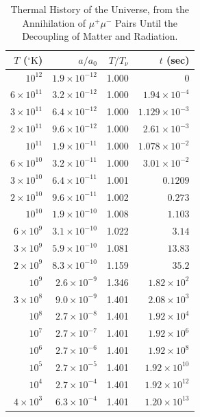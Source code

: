 \begingroup
\renewcommand{\thetable}{15.4}
\begin{table}[htbp]
  \centering
  \caption{Thermal History of the Universe, from the Annihilation of
  \(\mu^+\mu^-\) Pairs Until the Decoupling of Matter and Radiation.}
  \label{tab:15.4}
  \small
  \begin{tabular}{@{}rrrr@{}}
    \toprule
    \(T\) (\(^{\circ}\mathrm K\)) &
    \(a/a_0\) &
    \(T/T_\nu\) &
    \(t\) (sec) \\
    \midrule
    \(10^{12}\)            & \(1.9\times10^{-12}\) & 1.000 & \(0\) \\
    \(6\times10^{11}\)     & \(3.2\times10^{-12}\) & 1.000 & \(1.94\times10^{-4}\) \\
    \(3\times10^{11}\)     & \(6.4\times10^{-12}\) & 1.000 & \(1.129\times10^{-3}\) \\
    \(2\times10^{11}\)     & \(9.6\times10^{-12}\) & 1.000 & \(2.61\times10^{-3}\) \\
    \(10^{11}\)            & \(1.9\times10^{-11}\) & 1.000 & \(1.078\times10^{-2}\) \\
    \(6\times10^{10}\)     & \(3.2\times10^{-11}\) & 1.000 & \(3.01\times10^{-2}\) \\
    \(3\times10^{10}\)     & \(6.4\times10^{-11}\) & 1.001 & \(0.1209\) \\
    \(2\times10^{10}\)     & \(9.6\times10^{-11}\) & 1.002 & \(0.273\) \\
    \(10^{10}\)            & \(1.9\times10^{-10}\) & 1.008 & \(1.103\) \\
    \(6\times10^9\)        & \(3.1\times10^{-10}\) & 1.022 & \(3.14\) \\
    \(3\times10^9\)        & \(5.9\times10^{-10}\) & 1.081 & \(13.83\) \\
    \(2\times10^9\)        & \(8.3\times10^{-10}\) & 1.159 & \(35.2\) \\
    \(10^9\)               & \(2.6\times10^{-9}\)  & 1.346 & \(1.82\times10^2\) \\
    \(3\times10^8\)        & \(9.0\times10^{-9}\)  & 1.401 & \(2.08\times10^3\) \\
    \(10^8\)               & \(2.7\times10^{-8}\)  & 1.401 & \(1.92\times10^4\) \\
    \(10^7\)               & \(2.7\times10^{-7}\)  & 1.401 & \(1.92\times10^6\) \\
    \(10^6\)               & \(2.7\times10^{-6}\)  & 1.401 & \(1.92\times10^8\) \\
    \(10^5\)               & \(2.7\times10^{-5}\)  & 1.401 & \(1.92\times10^{10}\) \\
    \(10^4\)               & \(2.7\times10^{-4}\)  & 1.401 & \(1.92\times10^{12}\) \\
    \(4\times10^3\)        & \(6.3\times10^{-4}\)  & 1.401 & \(1.20\times10^{13}\) \\
    \bottomrule
  \end{tabular}


\end{table}
